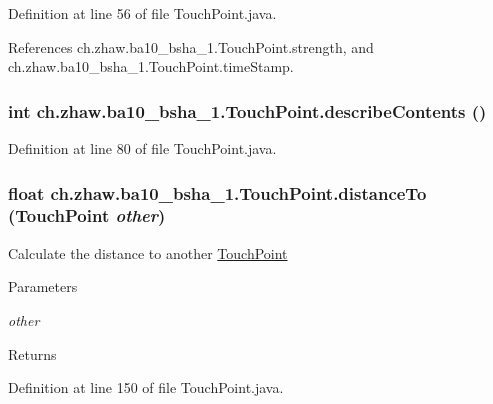 Definition at line 56 of file TouchPoint.java.

References ch.zhaw.ba10\_\-bsha\_\-1.TouchPoint.strength, and ch.zhaw.ba10\_\-bsha\_\-1.TouchPoint.timeStamp.\hypertarget{classch_1_1zhaw_1_1ba10__bsha__1_1_1TouchPoint_ad5596f285f8ff8daf89cf36f4074df0f}{
\subsubsection[{describeContents}]{\setlength{\rightskip}{0pt plus 5cm}int ch.zhaw.ba10\_\-bsha\_\-1.TouchPoint.describeContents ()}}
\label{classch_1_1zhaw_1_1ba10__bsha__1_1_1TouchPoint_ad5596f285f8ff8daf89cf36f4074df0f}


Definition at line 80 of file TouchPoint.java.\hypertarget{classch_1_1zhaw_1_1ba10__bsha__1_1_1TouchPoint_afb4bcfacdc81a0922e69fcef9f07dbf8}{
\subsubsection[{distanceTo}]{\setlength{\rightskip}{0pt plus 5cm}float ch.zhaw.ba10\_\-bsha\_\-1.TouchPoint.distanceTo ({\bf TouchPoint} {\em other})}}
\label{classch_1_1zhaw_1_1ba10__bsha__1_1_1TouchPoint_afb4bcfacdc81a0922e69fcef9f07dbf8}
Calculate the distance to another \hyperlink{classch_1_1zhaw_1_1ba10__bsha__1_1_1TouchPoint}{TouchPoint}


\begin{DoxyParams}{Parameters}
\item[{\em other}]\end{DoxyParams}
\begin{DoxyReturn}{Returns}

\end{DoxyReturn}


Definition at line 150 of file TouchPoint.java.

